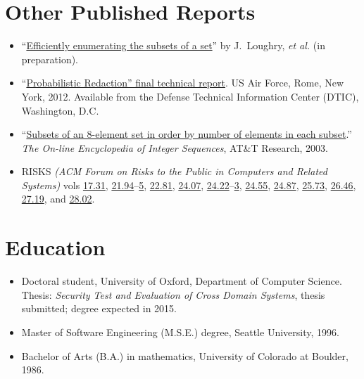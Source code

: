 \documentclass[12pt,twoside,letterpaper]{article}
\begin{document}
\section*{Other Published Reports}
\vspace{-2mm}
\begin{itemize}
	\item ``\href{http://www.call-with-current-continuation.com/papers/subset.pdf}%
{Efficiently enumerating the subsets of a set}'' by J.\ Loughry,
{\it et al.} (in preparation).\vspace{-1mm}

	\item ``\href{http://call-with-current-continuation.com/papers/Loughry2011.pdf}%
{Probabilistic Redaction'' final technical report}. US Air Force, Rome,
New York, 2012. Available from the Defense Technical Information Center
(DTIC), Washington, D.C.\vspace{-1mm}

	\item ``\href{http://oeis.org/A047869}{Subsets of an 8-element set
		in order by number of elements in each subset}.'' \emph{The On-line
		Encyclopedia of Integer Sequences}, AT\&T Research, 2003.\vspace{-1mm}

	\item RISKS \emph{(ACM Forum on Risks to the Public in Computers
		and Related Systems)} vols
		\href{http://catless.ncl.ac.uk/Risks/17.31.html}{17.31},
		\href{http://catless.ncl.ac.uk/Risks/21.94.html}{21.94}--\href{http://catless.ncl.ac.uk/Risks/21.95.html}{5},
		\href{http://catless.ncl.ac.uk/Risks/21.81.html}{22.81},
		\href{http://catless.ncl.ac.uk/Risks/24.07.html}{24.07},
		\href{http://catless.ncl.ac.uk/Risks/24.22.html}{24.22}--\href{http://catless.ncl.ac.uk/Risks/24.23.html}{3},
		\href{http://catless.ncl.ac.uk/Risks/24.55.html}{24.55},
		\href{http://catless.ncl.ac.uk/Risks/24.87.html}{24.87},
		\href{http://catless.ncl.ac.uk/Risks/25.73.html}{25.73},
		\href{http://catless.ncl.ac.uk/Risks/26.46.html}{26.46},
		\href{http://catless.ncl.ac.uk/Risks/27.19.html}{27.19},
		and \href{http://catless.ncl.ac.uk/Risks/28.02.html}{28.02}.
\end{itemize}

\vspace{-8mm}
\section*{Education}
\vspace{-2mm}
\begin{itemize}
	\item Doctoral student, University of Oxford, Department of
		Computer Science. Thesis: \emph{Security Test and
		Evaluation of Cross Domain Systems}, thesis submitted; degree expected in 2015.\vspace{-1mm}
	\item Master of Software Engineering (M.S.E.) degree, Seattle University, 1996.\vspace{-1mm}
	\item Bachelor of Arts (B.A.) in mathematics, University of Colorado at Boulder, 1986.
\end{itemize}
\end{document}
